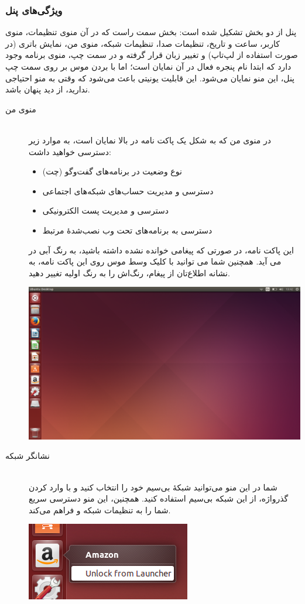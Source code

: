 \subsubsection{ویژگی‌های پنل}
پنل از دو بخش تشکیل شده است: بخش سمت راست که در آن منوی تنظیمات، منوی کاربر، ساعت و تاریخ، تنظیمات صدا، تنظیمات شبکه، منوی من، نمایش باتری (در صورت استفاده از لپ‌تاپ) و تغییر زبان قرار گرفته و در سمت چپ، منوی برنامه وجود دارد که ابتدا نام پنجره فعال در آن نمایان است؛ اما با بردن موس بر روی سمت چپ پنل، این منو نمایان می‌شود. این قابلیت یونیتی باعث می‌شود که وقتی به منو احتیاجی ندارید، از دید پنهان باشد.
\begin{description}
\item[منوی من] \hfill \\
در منوی من که به شکل یک پاکت نامه در بالا نمایان است، به موارد زیر دسترسی خواهید داشت:
\begin{itemize}
\item نوع وضعیت در برنامه‌های گفت‌وگو (چت)
\item دسترسی و مدیریت حساب‌های شبکه‌های اجتماعی
\item دسترسی و مدیریت پست الکترونیکی
\item دسترسی به برنامه‌های تحت وب نصب‌شدهٔ مرتبط
\end{itemize}
این پاکت نامه، در صورتی که پیغامی خوانده نشده داشته باشید، به رنگ آبی در می آید. همچنین شما می توانید با کلیک وسط موس روی این پاکت نامه، به نشانه اطلاع‌تان از پیغام، رنگ‌اش را به رنگ اولیه تغییر دهید.
\begin{center}
\includegraphics[scale=0.43]{pics/14.png}
\end{center}

\item[نشانگر شبکه] \hfill \\
شما در این منو می‌توانید شبکهٔ بی‌سیم خود را انتخاب کنید و با وارد کردن گذرواژه، از این شبکه بی‌سیم استفاده کنید. همچنین، این منو دسترسی سریع شما را به تنظیمات شبکه و  فراهم می‌کند.
\begin{center}
\includegraphics[scale=0.43]{pics/15.png}
\end{center}


\end{description}
